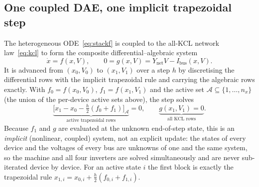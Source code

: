 \documentclass[12pt,a4paper]{article}
\theoremstyle{remark}
\begin{document}
\subsection{One coupled DAE, one implicit trapezoidal step}\label{sec:ts-couple}
The heterogeneous ODE~\eqref{eq:stackf} is coupled to the all-KCL network
law~\eqref{eq:kcl} to form the composite differential--algebraic system
\begin{equation}
  \dot x = f(x,V),\qquad 0 = g(x,V)=Y_{\mathrm{net}}V-I_{\mathrm{bus}}(x,V).
  \label{eq:dae}
\end{equation}
It is advanced from $(x_0,V_0)$ to $(x_1,V_1)$ over a step $h$ by discretising
the differential rows with the implicit trapezoidal rule and carrying the
algebraic rows exactly. With $f_0=f(x_0,V_0)$, $f_1=f(x_1,V_1)$ and the active
set $\mathcal{A}\subseteq\{1,\dots,n_x\}$ (the union of the per-device active
sets above), the step solves
\begin{equation}
  \underbrace{\bigl[x_1-x_0-\tfrac{h}{2}(f_0+f_1)\bigr]_{\mathcal{A}}}
     _{\text{active trapezoidal rows}}=0,
  \qquad
  \underbrace{g(x_1,V_1)=0}_{\text{all KCL rows}}.
  \label{eq:trap}
\end{equation}
Because $f_1$ and $g$ are evaluated at the unknown end-of-step state, this is an
\emph{implicit} (nonlinear, coupled) system, not an explicit update: the states
of every device and the voltages of every bus are unknowns of one and the same
system, so the machine and all four inverters are solved simultaneously and are
never sub-iterated device by device. For an active state $i$ the first block is
exactly the trapezoidal rule
$x_{1,i}=x_{0,i}+\tfrac{h}{2}(f_{0,i}+f_{1,i})$.
\end{document}
